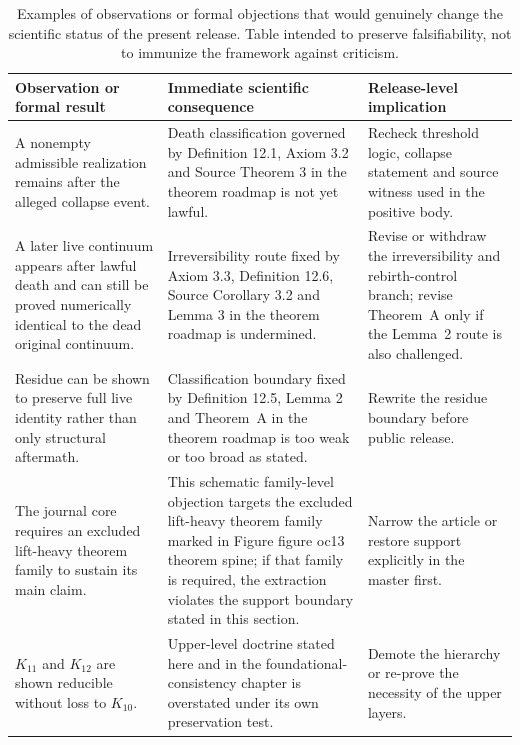 \begin{table}[htbp]
\centering
\begingroup
\footnotesize
\RaggedRight
\setlength{\tabcolsep}{4pt}
\begin{tabular}{@{}L{0.27\textwidth}L{0.36\textwidth}L{0.22\textwidth}@{}}
\toprule
\textbf{Observation or formal result} & \textbf{Immediate scientific consequence} & \textbf{Release-level implication} \\
\midrule
A nonempty admissible realization remains after the alleged collapse event. & Death classification governed by Definition 12.1, Axiom 3.2 and Source Theorem 3 in the theorem roadmap is not yet lawful. & Recheck threshold logic, collapse statement and source witness used in the positive body. \\
A later live continuum appears after lawful death and can still be proved numerically identical to the dead original continuum. & Irreversibility route fixed by Axiom 3.3, Definition 12.6, Source Corollary 3.2 and Lemma 3 in the theorem roadmap is undermined. & Revise or withdraw the irreversibility and rebirth-control branch; revise Theorem~A only if the Lemma~2 route is also challenged. \\
Residue can be shown to preserve full live identity rather than only structural aftermath. & Classification boundary fixed by Definition 12.5, Lemma 2 and Theorem~A in the theorem roadmap is too weak or too broad as stated. & Rewrite the residue boundary before public release. \\
The journal core requires an excluded lift-heavy theorem family to sustain its main claim. & This schematic family-level objection targets the excluded lift-heavy theorem family marked in Figure figure oc13 theorem spine; if that family is required, the extraction violates the support boundary stated in this section. & Narrow the article or restore support explicitly in the master first. \\
\(K_{11}\) and \(K_{12}\) are shown reducible without loss to \(K_{10}\). & Upper-level doctrine stated here and in the foundational-consistency chapter is overstated under its own preservation test. & Demote the hierarchy or re-prove the necessity of the upper layers. \\
\bottomrule
\end{tabular}
\endgroup
\caption{Examples of observations or formal objections that would genuinely
change the scientific status of the present release. Table intended to
preserve falsifiability, not to immunize the framework against criticism.}
\label{tab:oc13-counterexamples}
\end{table}

